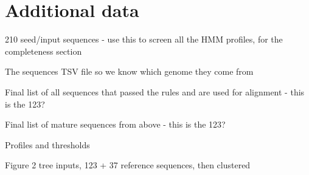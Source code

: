 \section*{Additional data}

210 seed/input sequences - use this to screen all the HMM profiles, for the completeness section

The sequences TSV file so we know which genome they come from

Final list of all sequences that passed the rules and are used for alignment - this is the 123?

Final list of mature sequences from above - this is the 123?

Profiles and thresholds

Figure 2 tree inputs, 123 + 37 reference sequences, then clustered
